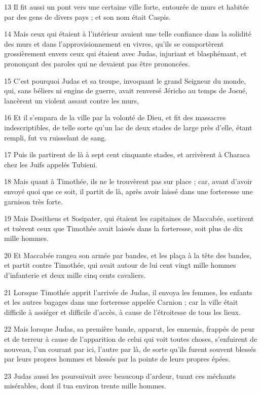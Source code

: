 \par 13 Il fit aussi un pont vers une certaine ville forte, entourée de murs et habitée par des gens de divers pays ; et son nom était Caspis.
\par 14 Mais ceux qui étaient à l'intérieur avaient une telle confiance dans la solidité des murs et dans l'approvisionnement en vivres, qu'ils se comportèrent grossièrement envers ceux qui étaient avec Judas, injuriant et blasphémant, et prononçant des paroles qui ne devaient pas être prononcées.
\par 15 C'est pourquoi Judas et sa troupe, invoquant le grand Seigneur du monde, qui, sans béliers ni engins de guerre, avait renversé Jéricho au temps de Josué, lancèrent un violent assaut contre les murs,
\par 16 Et il s'empara de la ville par la volonté de Dieu, et fit des massacres indescriptibles, de telle sorte qu'un lac de deux stades de large près d'elle, étant rempli, fut vu ruisselant de sang.
\par 17 Puis ils partirent de là à sept cent cinquante stades, et arrivèrent à Characa chez les Juifs appelés Tubieni.
\par 18 Mais quant à Timothée, ils ne le trouvèrent pas sur place ; car, avant d'avoir envoyé quoi que ce soit, il partit de là, après avoir laissé dans une forteresse une garnison très forte.
\par 19 Mais Dositheus et Sosipater, qui étaient les capitaines de Maccabée, sortirent et tuèrent ceux que Timothée avait laissés dans la forteresse, soit plus de dix mille hommes.
\par 20 Et Maccabée rangea son armée par bandes, et les plaça à la tête des bandes, et partit contre Timothée, qui avait autour de lui cent vingt mille hommes d'infanterie et deux mille cinq cents cavaliers.
\par 21 Lorsque Timothée apprit l'arrivée de Judas, il envoya les femmes, les enfants et les autres bagages dans une forteresse appelée Carnion ; car la ville était difficile à assiéger et difficile d'accès, à cause de l'étroitesse de tous les lieux.
\par 22 Mais lorsque Judas, sa première bande, apparut, les ennemis, frappés de peur et de terreur à cause de l'apparition de celui qui voit toutes choses, s'enfuirent de nouveau, l'un courant par ici, l'autre par là, de sorte qu'ils furent souvent blessés par leurs propres hommes et blessés par la pointe de leurs propres épées.
\par 23 Judas aussi les poursuivait avec beaucoup d'ardeur, tuant ces méchants misérables, dont il tua environ trente mille hommes.
